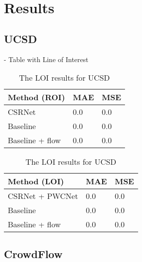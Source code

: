 \chapter{Results}
\section{UCSD}
- Table with Line of Interest

\begin{table}[!htb]
    \begin{minipage}{.5\linewidth}
      \centering
		\begin{tabular}{lll}
		\hline
		Method (ROI)                               & MAE & MSE \\ \hline
		\multicolumn{1}{l|}{CSRNet}          & 0.0 & 0.0 \\
		\multicolumn{1}{l|}{Baseline}        & 0.0 & 0.0 \\
		\multicolumn{1}{l|}{Baseline + flow} & 0.0 & 0.0 \\ \hline
		\end{tabular}
		\caption{\label{tab:roi_ucsd}The ROI results for UCSD}
	\end{minipage}
	\begin{minipage}{.5\linewidth}
      \centering
		\begin{tabular}{lll}
		\hline
		Method (LOI)                               & MAE & MSE \\ \hline
		\multicolumn{1}{l|}{CSRNet + PWCNet}          & 0.0 & 0.0 \\
		\multicolumn{1}{l|}{Baseline}        & 0.0 & 0.0 \\
		\multicolumn{1}{l|}{Baseline + flow} & 0.0 & 0.0 \\ \hline
		\end{tabular}
		\caption{\label{tab:loi_ucsd}The LOI results for UCSD}
	\end{minipage}
\end{table}

\section{CrowdFlow}

